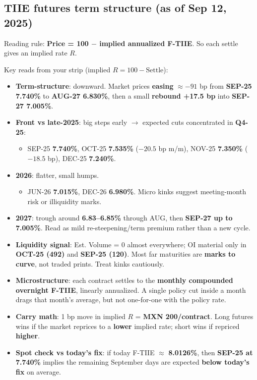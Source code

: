 \documentclass[10pt,a4paper]{article} %
\begin{document}
\subsection{TIIE futures term structure (as of Sep 12, 2025)}
Reading rule: \textbf{Price = 100 $-$ implied annualized F-TIIE}. So each settle gives an implied rate $R$.

Key reads from your strip (implied $R=100-\text{Settle}$):

\begin{itemize}
  \item \textbf{Term-structure}: downward. Market prices \textbf{easing} $\approx -91$ bp from \textbf{SEP-25 7.740\%} to \textbf{AUG-27 6.830\%}, then a small \textbf{rebound +17.5 bp} into \textbf{SEP-27 7.005\%}.
  \item \textbf{Front vs late-2025}: big steps early $\rightarrow$ expected cuts concentrated in \textbf{Q4-25}:
    \begin{itemize}
      \item SEP-25 \textbf{7.740\%}, OCT-25 \textbf{7.535\%} ($-20.5$ bp m/m), NOV-25 \textbf{7.350\%} ($-18.5$ bp), DEC-25 \textbf{7.240\%}.
    \end{itemize}
  \item \textbf{2026}: flatter, small humps.
    \begin{itemize}
      \item JUN-26 \textbf{7.015\%}, DEC-26 \textbf{6.980\%}. Micro kinks suggest meeting-month risk or illiquidity marks.
    \end{itemize}
  \item \textbf{2027}: trough around \textbf{6.83--6.85\%} through AUG, then \textbf{SEP-27 up to 7.005\%}. Read as mild re-steepening/term premium rather than a new cycle.
  \item \textbf{Liquidity signal}: Est. Volume = 0 almost everywhere; OI material only in \textbf{OCT-25 (492)} and \textbf{SEP-25 (120)}. Most far maturities are \textbf{marks to curve}, not traded prints. Treat kinks cautiously.
  \item \textbf{Microstructure}: each contract settles to the \textbf{monthly compounded overnight F-TIIE}, linearly annualized. A single policy cut inside a month drags that month’s average, but not one-for-one with the policy rate.
  \item \textbf{Carry math}: 1 bp move in implied $R$ = \textbf{MXN 200/contract}. Long futures wins if the market reprices to a \textbf{lower} implied rate; short wins if repriced \textbf{higher}.
  \item \textbf{Spot check vs today’s fix}: if today F-TIIE $\approx$ \textbf{8.0126\%}, then \textbf{SEP-25 at 7.740\%} implies the remaining September days are expected \textbf{below today’s fix} on average.
\end{itemize}
\end{document}
